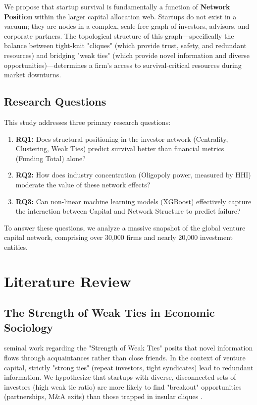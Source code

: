 \documentclass[11pt, a4paper]{article}
\begin{document}
We propose that startup survival is fundamentally a function of \textbf{Network Position} within the larger capital allocation web. Startups do not exist in a vacuum; they are nodes in a complex, scale-free graph of investors, advisors, and corporate partners. The topological structure of this graph---specifically the balance between tight-knit "cliques" (which provide trust, safety, and redundant resources) and bridging "weak ties" (which provide novel information and diverse opportunities)---determines a firm's access to survival-critical resources during market downturns.

\subsection{Research Questions}
This study addresses three primary research questions:
\begin{enumerate}
    \item \textbf{RQ1:} Does structural positioning in the investor network (Centrality, Clustering, Weak Ties) predict survival better than financial metrics (Funding Total) alone?
    \item \textbf{RQ2:} How does industry concentration (Oligopoly power, measured by HHI) moderate the value of these network effects?
    \item \textbf{RQ3:} Can non-linear machine learning models (XGBoost) effectively capture the interaction between Capital and Network Structure to predict failure?
\end{enumerate}

To answer these questions, we analyze a massive snapshot of the global venture capital network, comprising over 30,000 firms and nearly 20,000 investment entities.

\section{Literature Review}

\subsection{The Strength of Weak Ties in Economic Sociology}
\citet{granovetter1973} seminal work regarding the "Strength of Weak Ties" posits that novel information flows through acquaintances rather than close friends. In the context of venture capital, strictly "strong ties" (repeat investors, tight syndicates) lead to redundant information. We hypothesize that startups with diverse, disconnected sets of investors (high weak tie ratio) are more likely to find "breakout" opportunities (partnerships, M\&A exits) than those trapped in insular cliques \citep{burt2004}.
\end{document}
